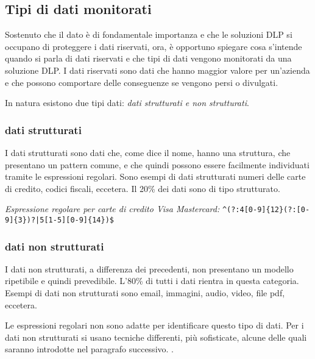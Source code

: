 \subsection{Tipi di dati monitorati}
    Sostenuto che il dato è di fondamentale importanza e che le soluzioni DLP si occupano di proteggere i dati riservati,
    ora, è opportuno spiegare cosa s'intende quando si parla di dati riservati e che tipi di dati vengono monitorati 
    da una soluzione DLP. I dati riservati sono dati che hanno maggior valore per un'azienda e che possono comportare 
    delle conseguenze se vengono persi o divulgati.

    In natura esistono due tipi dati: \textit{dati strutturati e non strutturati}.
        \subsubsection{dati strutturati}
            I dati strutturati sono dati che, come dice il nome, hanno una struttura, che presentano un pattern comune, e che 
            quindi possono essere facilmente individuati tramite le espressioni regolari. 
            Sono esempi di dati strutturati numeri delle carte di credito, codici fiscali, eccetera.
            Il 20\% dei dati sono di tipo strutturato. 
    
            \begin{center} 
                \textit{Espressione regolare per carte di credito Visa Mastercard:}
                \verb/^(?:4[0-9]{12}(?:[0-9]{3})?|5[1-5][0-9]{14})$/ 
            \end{center}

        \subsubsection{dati non strutturati}
            I dati non strutturati, a differenza dei precedenti, non presentano un modello ripetibile
            e quindi prevedibile. L'80\% di tutti i dati rientra in questa categoria. Esempi di dati non 
            strutturati sono email, immagini, audio, video, file pdf, eccetera. 
    
    Le espressioni regolari non sono adatte per identificare questo tipo di dati. %
    Per i dati non strutturati si usano tecniche differenti, più sofisticate, alcune delle quali saranno introdotte nel paragrafo successivo. \cite{DLP3}.

